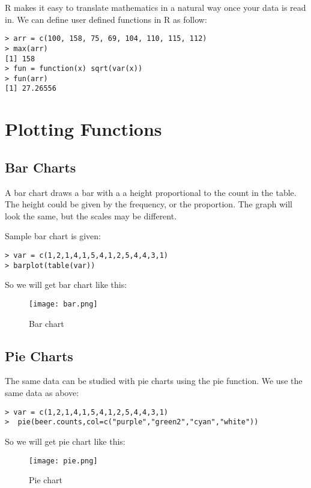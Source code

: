 \documentclass{article}
\begin{document}
R makes it easy to translate mathematics in a natural way once your data is read in. We can define user defined functions in R as follow:
\begin{lstlisting}[frame=single]
> arr = c(100, 158, 75, 69, 104, 110, 115, 112)
> max(arr)
[1] 158
> fun = function(x) sqrt(var(x))
> fun(arr)
[1] 27.26556
\end{lstlisting}



\section{Plotting Functions}

\subsection{Bar Charts}
A bar chart draws a bar with a a height proportional to the count in the table. The height could be given by the
frequency, or the proportion. The graph will look the same, but the scales may be different.

Sample bar chart is given:

\begin{lstlisting}[frame=single ]
> var = c(1,2,1,4,1,5,4,1,2,5,4,4,3,1)
> barplot(table(var))
\end{lstlisting} 

So we will get bar chart like this:\\

 
\begin{figure}[h!]
\texttt{[image: bar.png]}
  \centering
  \caption{Bar chart}
  \label{fig:barchart1}
\end{figure}


\subsection{Pie Charts}
The same data can be studied with pie charts using the pie function. We use the same data as above:

\begin{lstlisting}[frame=single ]
> var = c(1,2,1,4,1,5,4,1,2,5,4,4,3,1)
>  pie(beer.counts,col=c("purple","green2","cyan","white"))
\end{lstlisting} 

So we will get pie chart like this:\\

 
\begin{figure}[h!]
\texttt{[image: pie.png]}
  \centering
  \caption{Pie chart}
  \label{fig:barchart1}
\end{figure}
\end{document}
